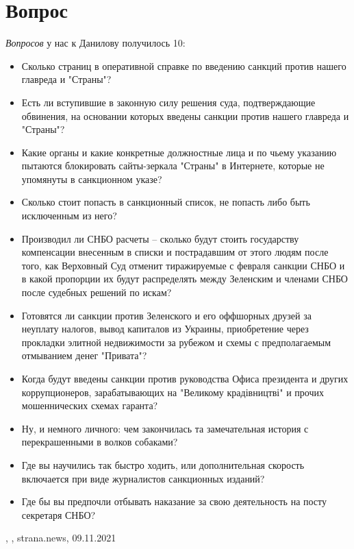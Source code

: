  
 
 
 
 
\chapter{Вопрос}
\label{sec:slova.vopros}

\emph{Вопросов} у нас к Данилову получилось 10:
\begin{itemize} %
\item Сколько страниц в оперативной справке по введению санкций против нашего главреда и "Страны"?
\item Есть ли вступившие в законную силу решения суда, подтверждающие обвинения, на основании которых введены санкции против нашего главреда и "Страны"?
\item Какие органы и какие конкретные должностные лица и по чьему указанию пытаются блокировать сайты-зеркала "Страны" в Интернете, которые не упомянуты в санкционном указе?
\item Сколько стоит попасть в санкционный список, не попасть либо быть исключенным из него?
\item Производил ли СНБО расчеты – сколько будут стоить государству компенсации внесенным в списки и пострадавшим от этого людям после того, как Верховный Суд отменит тиражируемые с февраля санкции СНБО и в какой пропорции их будут распределять между Зеленским и членами СНБО после судебных решений по искам?
\item Готовятся ли санкции против Зеленского и его оффшорных друзей за неуплату налогов, вывод капиталов из Украины, приобретение через прокладки элитной недвижимости за рубежом и схемы с предполагаемым отмыванием денег "Привата"?
\item Когда будут введены санкции против руководства Офиса президента и других коррупционеров, зарабатывающих на "Великому крадівництві" и прочих мошеннических схемах гаранта?
\item Ну, и немного личного: чем закончилась та замечательная история с перекрашенными в волков собаками?
\item Где вы научились так быстро ходить, или дополнительная скорость включается при виде журналистов санкционных изданий?
\item Где бы вы предпочли отбывать наказание за свою деятельность на посту секретаря СНБО?
\end{itemize} %
, 
, strana.news, 09.11.2021

